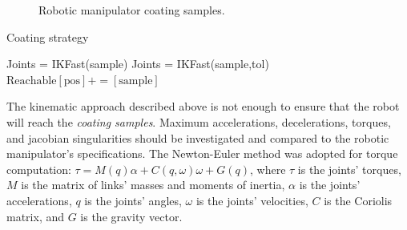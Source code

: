 \begin{figure}
	\centering
	\quad
    \caption{Robotic manipulator coating samples.}
     \label{fig:coating}
\end{figure}

\begin{algorithm}
\caption{Coating strategy}
\label{alg:strategy}
\begin{algorithmic}[1]
			\State Joints = IKFast(sample)
				\State Joints = IKFast(sample,tol)
			\EndIf
				\State $\textrm{Reachable}[\textrm{pos}] += [\textrm{sample}]$
				\label{algvar:reachable}
			\EndIf
		\EndFor
\EndFor
\end{algorithmic}
\end{algorithm}

The kinematic approach described above is not enough to ensure that the robot
will reach the \textit{coating samples}. Maximum accelerations, decelerations,
torques, and jacobian singularities should be investigated and compared to the robotic
manipulator's specifications. The Newton-Euler method
\cite{sciavicco2000differential} was adopted for torque computation: $\tau =
M(q)\alpha + C(q,\omega)\omega + G(q)$, where $\tau$ is the joints' torques,
$M$ is the matrix of links' masses and moments of inertia, $\alpha$ is the
joints' accelerations, $q$ is the joints' angles, $\omega$ is the joints'
velocities, $C$ is the Coriolis matrix, and $G$ is the gravity vector.

